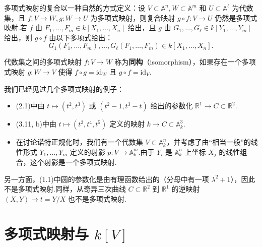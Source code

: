 多项式映射的复合以一种自然的方式定义：设 \(V \subset  {\mathbb{A}}^{n}, W \subset  {\mathbb{A}}^{m}\) 和 \(U \subset  {\mathbb{A}}^{\ell}\) 为代数集，且 \(f : V \rightarrow  W, g : W \rightarrow  U\) 为多项式映射，则复合映射 \(g \circ  f : V \rightarrow  U\) 仍然是多项式映射.若 \(f\) 由 \({F}_{1},\ldots ,{F}_{m} \in  k[X_1, \ldots, X_n]\) 给出，且 \(g\) 由 \({G}_{1},\ldots ,{G}_{\ell } \in k[Y_1, \ldots, Y_m]\) 给出，则 \(g \circ  f\) 由以下多项式给出：
\[
{G}_{1}(F_1, \ldots, F_m), \ldots, {G}_{\ell}(F_1, \ldots, F_m) \in  k[X_1, \ldots, X_n].
\]

\begin{definition}[同构]
代数集之间的多项式映射 \(f : V \rightarrow  W\) 称为\textbf{同构}（isomorphism），如果存在一个多项式映射 \(g : W \rightarrow  V\) 使得 \(f \circ  g = \mathrm{id}_W\) 且 \(g \circ  f = \mathrm{id}_V\).
\end{definition}

我们已经见过几个多项式映射的例子：
\begin{itemize}
    \item (2.1)中由 \(t \mapsto  (t^2, t^3)\) 或 \((t^2 - 1, t^3 - t)\) 给出的参数化 \({\mathbb{R}}^{1} \rightarrow  C \subset {\mathbb{R}}^{2}\).
    \item (3.11, b)中由 \(t \mapsto  (t^3, t^4, t^5)\) 定义的映射 \(k \rightarrow  C \subset  {\mathbb{A}}_{k}^{3}\).
    \item 在讨论诺特正规化时，我们有一个代数集 \(V \subset  {\mathbb{A}}_{k}^{n}\)，并考虑了由“相当一般”的线性形式 \({Y}_{1},\ldots ,{Y}_{m}\) 定义的射影 \(p : V \rightarrow  {\mathbb{A}}_{k}^{m}\).由于 \({Y}_{i}\) 是 \({\mathbb{A}}_{k}^{n}\) 上坐标 \({X}_{j}\) 的线性组合，这个射影是一个多项式映射.
\end{itemize}

另一方面，(1.1)中圆的参数化是由有理函数给出的（分母中有一项 \({\lambda }^{2} + 1\)），因此不是多项式映射.同样，从奇异三次曲线 \(C \subset  {\mathbb{R}}^{2}\) 到 \({\mathbb{R}}^{1}\) 的逆映射 \((X,Y) \mapsto  t = Y/X\) 也不是多项式映射.

\section{多项式映射与 \(k[V]\)}

